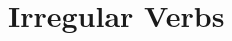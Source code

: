 \documentclass[grammar]{subfiles}
\begin{document}
%
%
%
%
%
%
%

  \section{Irregular Verbs}
  \label{sec:vm_irregular}

  
  \ToBeWritten
\end{document}
